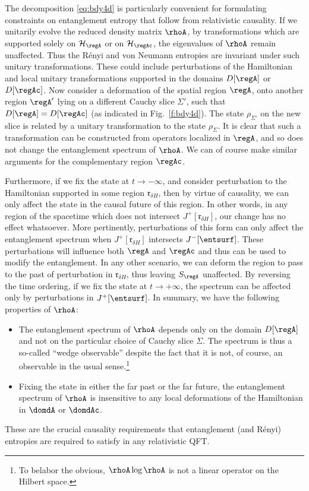 \documentclass[12pt,openany]{book}
\begin{document}
The decomposition \eqref{eq:bdy4d} is particularly convenient for formulating constraints on entanglement entropy that follow from relativistic causality. If we unitarily evolve the  reduced density matrix $\rhoA$, by transformations which are supported solely on ${\cal H}_{\regA}$ or on ${\cal H}_{\regAc}$, the eigenvalues of $\rhoA$ remain unaffected. Thus the R\'enyi and von Neumann entropies are invariant under such unitary transformations.  These could include perturbations of the Hamiltonian and local unitary transformations supported in the domains $D[\regA]$ or $D[\regAc]$.
Now consider a deformation of the spatial region $\regA$, onto another region $\regA'$ lying on a different Cauchy slice $\Sigma'$, such that $D[\regA]=D[\regAc]$ (as indicated in Fig.~\ref{f:bdy4d}). The state  $\rho_{\Sigma'}$ on the new slice is related by a unitary transformation to the state $\rho_\Sigma$. It is clear that such a transformation can be constructed from operators localized in $\regA$, and so does not change the entanglement spectrum of $\rhoA$. We can of course make similar arguments for the complementary region $\regAc$.

Furthermore, if we fix the state at $t\to-\infty$, and consider perturbation to the Hamiltonian supported in some region  $\mathfrak{r}_{\delta H}$, then by virtue of causality, we can only affect the state in the causal future of this region. In other words, in any region of the spacetime which does not intersect $J^+[\mathfrak{r}_{\delta H}]$, our change has no effect whatsoever.  More pertinently,  perturbations of this form can only affect the entanglement spectrum when $J^+[\mathfrak{r}_{\delta H}]$ intersects $J^-[\entsurf]$. These perturbations will influence both $\regA$ and $\regAc$ and thus can be used to modify the entanglement. In any other scenario, we can deform the region
to pass to the past of perturbation in $\mathfrak{r}_{\delta H}$, thus leaving $S_\regA$ unaffected. By reversing the time ordering, if we fix the state at $t\to+\infty$, the spectrum can be affected only by perturbations in $J^+[\entsurf]$. In summary, we have the following properties of $\rhoA$:
%
\begin{itemize}
\item
The entanglement spectrum of $\rhoA$ depends only on the domain $D[\regA]$ and not on the particular choice of Cauchy slice $\Sigma$. The spectrum is thus a so-called ``wedge observable'' despite the fact that it is not, of course, an observable in the usual sense.\footnote{ To belabor the obvious, $\rhoA \log \rhoA$ is not a linear operator on the Hilbert space.}
\item
Fixing the state in either the far past or the far future, the entanglement spectrum of $\rhoA$ is insensitive to any local deformations of the Hamiltonian in $\domdA$ or $\domdAc$.
\end{itemize}
%
These are the crucial causality requirements that entanglement (and R\'enyi) entropies are required to satisfy in any relativistic QFT.
\end{document}
